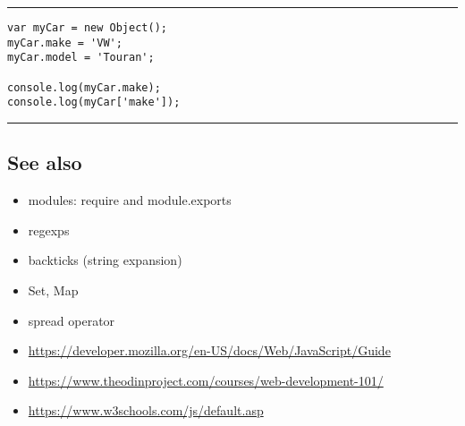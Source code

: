 \documentclass{article}[18pt]
\providecommand{\tightlist}{%
  \setlength{\itemsep}{0pt}\setlength{\parskip}{0pt}}
\begin{document}
\begin{center}\rule{0.5\linewidth}{\linethickness}\end{center}

\begin{verbatim}
var myCar = new Object();
myCar.make = 'VW';
myCar.model = 'Touran';

console.log(myCar.make);
console.log(myCar['make']);
\end{verbatim}

\begin{center}\rule{0.5\linewidth}{\linethickness}\end{center}

\hypertarget{see-also}{%
\subsection{See also}\label{see-also}}

\begin{itemize}
\tightlist
\item
  modules: require and module.exports
\item
  regexps
\item
  backticks (string expansion)
\item
  Set, Map
\item
  spread operator
\item
  \url{https://developer.mozilla.org/en-US/docs/Web/JavaScript/Guide}
\item
  \url{https://www.theodinproject.com/courses/web-development-101/}
\item
  \url{https://www.w3schools.com/js/default.asp}
\end{itemize}
\end{document}
